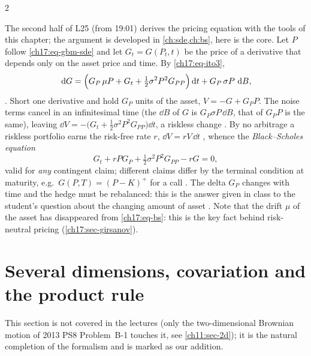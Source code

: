 \begin{paracol}{2}
\begin{finance}\label{ch17:fin-bs}
The second half of L25 (from 19:01) derives the pricing equation with the tools of this chapter; the argument is developed in \cref{ch:sde,ch:bs}, here is the core. Let $P$ follow \eqref{ch17:eq-gbm-sde} and let
$G_t=G(P_t,t)$ be the price of a derivative that depends only on the asset price and time. By \eqref{ch17:eq-ito3},
\[
  \,\mathrm{d} G=\Bigl(G_P\,\mu P+G_t+\tfrac12\sigma^2P^2G_{PP}\Bigr)\,\mathrm{d} t+G_P\,\sigma P\,\,\mathrm{d} B ,
\]
. Short one derivative and hold $G_P$ units of the asset, $V=-G+G_PP$. The noise terms cancel in an infinitesimal time (the $\dd B$ of $G$ is $G_P\sigma P\,\dd B$, that of $G_PP$ is the same),
leaving $\dd V=-\bigl(G_t+\tfrac12\sigma^2P^2G_{PP}\bigr)\dd t$, a riskless change . By no arbitrage a riskless portfolio earns the risk-free rate $r$, $\dd V=rV\,\dd t$
, whence the \emph{Black--Scholes equation}
\begin{equation}\label{ch17:eq-bs}
  G_t+rPG_P+\tfrac12\sigma^2P^2G_{PP}-rG=0 ,
\end{equation}
valid for \emph{any} contingent claim; different claims differ by the terminal condition at maturity, e.g.\ $G(P,T)=(P-K)^+$ for a call . The delta $G_P$ changes with time and the hedge must be rebalanced: this
is the answer given in class to the student's question about the changing amount of asset . Note that the drift $\mu$ of the asset has disappeared from \eqref{ch17:eq-bs}: this is the key fact behind risk-neutral pricing (\cref{ch17:sec-girsanov}).
\end{finance}

\section{Several dimensions, covariation and the product rule}\label{ch17:sec-multi}

This section is not covered in the lectures (only the two-dimensional Brownian motion of 2013 PS8 Problem~B-1 touches it, see \cref{ch11:sec-2d}); it is the natural completion of the formalism and is marked as our addition.


\end{paracol}

